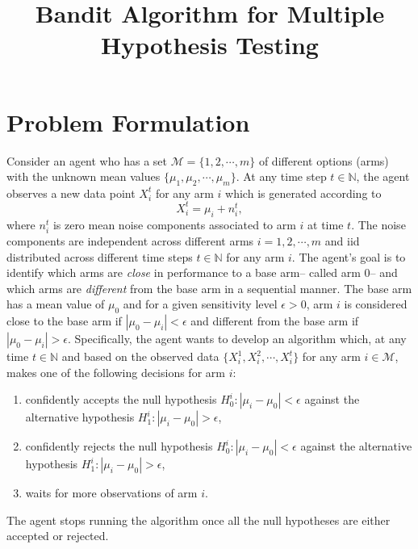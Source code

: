 \documentclass[12pt]{article}
\title{Bandit Algorithm for Multiple Hypothesis Testing}
\author{}
\date{}
\def\N{\mathbb{N}}
\def\N{\mathbb{N}}
\def\MM{\mathcal{M}}
\begin{document}
\maketitle


\section{Problem Formulation}
Consider an agent who has a set $\MM = \{1,2,\cdots,m\}$ of different options (arms) with the unknown mean values $\{\mu_1,\mu_2,\cdots,\mu_m\}$. At any time step $t\in\N$, the agent observes a new data point $X^t_i$ for any arm $i$ which is generated according to
\begin{equation}
\label{model1}
X^t_i = \mu_i + n^t_i,
\end{equation}
where $n^t_i$ is zero mean noise components associated to arm $i$ at time $t$. The noise components are independent across different arms $i = 1,2,\cdots,m$ and iid distributed across different time steps $t \in\N$ for any arm $i$. The agent's goal is to identify which  arms are {\em close} in performance to a base arm-- called arm 0-- and which arms are {\em different} from the base arm in a sequential manner. The base arm has a mean value of $\mu_0$ and for a given sensitivity level $\epsilon>0$, arm $i$ is considered close to the base arm if $|\mu_0-\mu_i|< \epsilon$ and different from the base arm if $|\mu_0-\mu_i|>\epsilon$. 
Specifically, the agent wants to develop an algorithm which, at any time $t\in\N$ and  based on the observed data $\{X_i^1,X_i^2,\cdots,X_i^t\}$ for any arm $i\in\MM$, makes one of the following decisions for arm $i$: 
\begin{enumerate}
\item confidently accepts the null hypothesis $H_0^i:|\mu_i-\mu_0|< \epsilon$ against the alternative hypothesis $H^i_1:|\mu_i-\mu_0|> \epsilon$,
\item confidently rejects the null hypothesis $H_0^i:|\mu_i-\mu_0|< \epsilon$ against the alternative hypothesis $H^i_1:|\mu_i-\mu_0|> \epsilon$,
\item waits for more observations of arm $i$.
\end{enumerate}
The agent stops running the algorithm once all the null hypotheses are either accepted or rejected.
\end{document}
